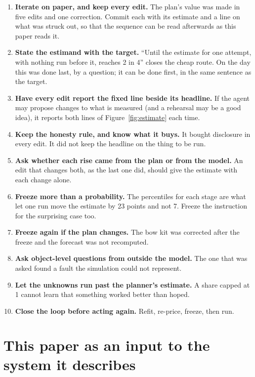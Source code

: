 \documentclass[11pt,a4paper]{article}
\begin{document}
\begin{enumerate}[leftmargin=1.6em,itemsep=3pt]
\item \textbf{Iterate on paper, and keep every edit.} The plan's value was made in five edits and one correction. Commit each with its estimate and a line on what was struck out, so that the sequence can be read afterwards as this paper reads it.
\item \textbf{State the estimand with the target.} ``Until the estimate for one attempt, with nothing run before it, reaches 2 in 4'' closes the cheap route. On the day this was done last, by a question; it can be done first, in the same sentence as the target.
\item \textbf{Have every edit report the fixed line beside its headline.} If the agent may propose changes to what is measured (and a rehearsal may be a good idea), it reports both lines of Figure~\ref{fig:estimate} each time.
\item \textbf{Keep the honesty rule, and know what it buys.} It bought disclosure in every edit. It did not keep the headline on the thing to be run.
\item \textbf{Ask whether each rise came from the plan or from the model.} An edit that changes both, as the last one did, should give the estimate with each change alone.
\item \textbf{Freeze more than a probability.} The percentiles for each stage are what let one run move the estimate by 23 points and not 7. Freeze the instruction for the surprising case too.
\item \textbf{Freeze again if the plan changes.} The bow kit was corrected after the freeze and the forecast was not recomputed.
\item \textbf{Ask object-level questions from outside the model.} The one that was asked found a fault the simulation could not represent.
\item \textbf{Let the unknowns run past the planner's estimate.} A share capped at 1 cannot learn that something worked better than hoped.
\item \textbf{Close the loop before acting again.} Refit, re-price, freeze, then run.
\end{enumerate}

\section{This paper as an input to the system it describes}
\label{sec:reflexive}
\end{document}
